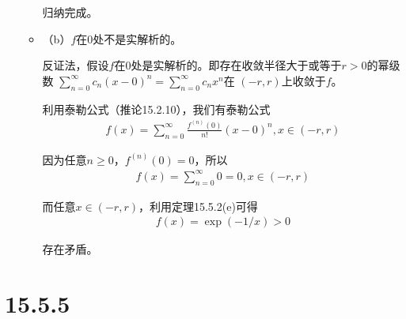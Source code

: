 \documentclass{article}
\begin{document}
\begin{itemize}
\begin{itemize}
                归纳完成。


          \item （b）$f$在$0$处不是实解析的。


                反证法，假设$f$在$0$处是实解析的。即存在收敛半径大于或等于$r> 0$的幂级数
                $\sum\limits_{n = 0}^\infty c_n(x - 0)^n = \sum\limits_{n = 0}^\infty c_nx^n$在
                $(-r, r)$上收敛于$f$。

                利用泰勒公式（推论15.2.10），我们有泰勒公式
                \begin{align*}
                  f(x) = \sum\limits_{n = 0}^\infty \frac{f^{(n)}(0)}{n!}(x - 0)^n, x \in (-r, r)
                \end{align*}

                因为任意$n \geq 0$，$f^{(n)}(0) = 0$，所以
                \begin{align*}
                  f(x) = \sum\limits_{n = 0}^\infty 0 = 0, x \in (-r, r)
                \end{align*}

                而任意$x \in (-r, r)$，利用定理15.5.2(e)可得
                \begin{align*}
                  f(x) = \exp(-1/x) > 0
                \end{align*}

                存在矛盾。


        \end{itemize}
\end{itemize}

\section*{15.5.5}
\end{document}
